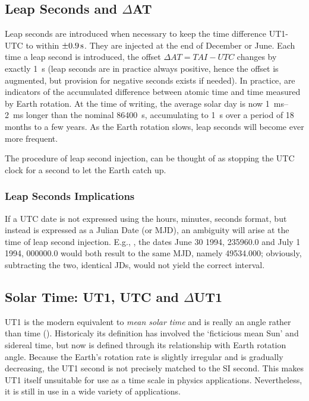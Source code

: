 \subsection{Leap Seconds and $\Delta$AT}
\label{ssec:leap-seconds-dat}
Leap seconds are introduced when necessary to keep the time difference UT1-UTC 
to within \(\SI{\pm 0.9}{\second}\). They are injected at the end of December or 
June. Each time a leap second is introduced, the offset \(\Delta AT = TAI - UTC\) 
changes by exactly \SI{1}{\second} (leap seconds are in practice always positive, hence 
the offset is augmented, but provision for negative seconds exists if needed). In 
practice, are indicators of the accumulated difference between atomic time and time 
measured by Earth rotation. At the time of writing, the average solar day 
is now \SIrange{1}{2}{\milli\second} longer than the nominal \SI{86400}{\second}, accumulating 
to \SI{1}{\second} over a period of 18 months to a few years. As the Earth rotation 
slows, leap seconds will become ever more frequent.

The procedure of leap second injection, can be thought of as stopping the UTC clock 
for a second to let the Earth catch up.

\subsubsection{Leap Seconds Implications}
If a UTC date is not expressed using the hours, minutes, seconds format, but instead 
is expressed as a Julian Date (or MJD), an ambiguity will 
arise at the time of leap second injection. E.g., \cite{sofa_18161_tscb}, the dates 
June 30 1994, 235960.0 and July 1 1994, 000000.0 would both result to the same 
MJD, namely 49534.000; obviously, subtracting the two, identical JDs, would not 
yield the correct interval.

\subsection{Solar Time: UT1, UTC and $\Delta$UT1}
UT1 is the modern equivalent to \emph{mean solar time} and is really an angle rather 
than time (\cite{sofa_18161_tscb}). Historicaly its definition has involved the 
`ficticious mean Sun' and sidereal time, but now is defined through its relationship 
with Earth rotation angle. Because the Earth's rotation rate is slightly irregular
and is gradually decreasing, the UT1 second is not precisely matched to the SI second.
This makes UT1 itself unsuitable for use as a time scale in physics applications.
Nevertheless, it is still in use in a wide variety of applications.

